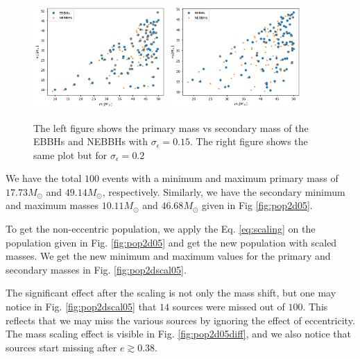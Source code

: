 \documentclass[twocolumn,prd,nofootinbib]{revtex4}
\begin{document}
\begin{figure}

\includegraphics[width=0.45\textwidth]{paper/figures/pop0.15.png}
\includegraphics[width=0.45\textwidth]{paper/figures/pop0.2.png}
\caption{\label{fig:pop_0.15_0.2} The left figure shows the primary mass vs secondary mass of the EBBHs and NEBBHs with $\sigma_\epsilon =0.15$. The right figure shows the same plot but for $\sigma_\epsilon=0.2$} 

\end{figure}
We have the total $100$ events with a minimum and maximum primary mass of $17.73 M_\odot$ and $49.14 M_\odot$, respectively. Similarly, we have the secondary minimum and maximum masses $10.11 M_\odot$ and $46.68 M_\odot$ given in Fig \ref{fig:pop2d05}.



To get the non-eccentric population, we apply the Eq. \ref{eq:scaling} on the population given in Fig. \ref{fig:pop2d05} and get the new population with scaled masses. We get the new minimum and maximum values for the primary and secondary masses in Fig. \ref{fig:pop2dscal05}. 
   


The significant effect after the scaling is not only the mass shift, but one may notice in Fig. \ref{fig:pop2dscal05} that $14$ sources were missed out of $100$. This reflects that we may miss the various sources by ignoring the effect of eccentricity. The mass scaling effect is visible in Fig. \ref{fig:pop2d05diff}, and we also notice that sources start missing after $e \gtrsim 0.38$.
\end{document}
